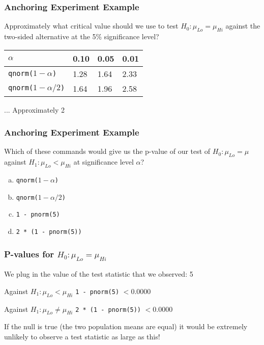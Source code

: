 \documentclass{beamer}
\begin{document}
\begin{frame}[t]
\frametitle{Anchoring Experiment Example }
Approximately what critical value should we use to test $H_0\colon \mu_{Lo} = \mu_{Hi}$ against the two-sided alternative at the 5\% significance level?

\pause
\vspace{1em}
\begin{center}
\begin{tabular}{l|lll}
$\alpha$ &   0.10& 0.05 &0.01\\
\hline
\texttt{qnorm($1-\alpha$)} & 1.28 &1.64 &2.33\\
\texttt{qnorm($1-\alpha/2$)} &1.64 &\alert{1.96}& 2.58
\end{tabular}
\end{center}
\hfill \alert{... Approximately 2}
\end{frame}
\begin{frame}
\frametitle{Anchoring Experiment Example}
Which of these commands would give us the p-value of our test of $H_0\colon \mu_{Lo} = \mu$ against $H_1\colon \mu_{Lo}<\mu_{Hi}$ at significance level $\alpha$?
\vspace{1em}
	\begin{enumerate}[(a)]
		\item \texttt{qnorm($1-\alpha$)}
		\item \texttt{qnorm($1-\alpha/2$)}
		\item \texttt{1 - pnorm(5)}
		\item \texttt{2 * (1 - pnorm(5))}
	\end{enumerate}
	

\end{frame}

\begin{frame}
\frametitle{P-values for $H_0\colon \mu_{Lo} = \mu_{Hi}$}
We plug in the value of the test statistic that we observed: 5
\begin{block}{Against $H_1\colon \mu_{Lo}< \mu_{Hi}$}
\texttt{1 - pnorm(5)} $< 0.0000$
\end{block}

\begin{block}{Against $H_1\colon \mu_{Lo}\neq \mu_{Hi}$}
\texttt{2 * (1 - pnorm(5))} $< 0.0000$
\end{block}

\vspace{1em}

\alert{If the null is true (the two population means are equal) it would be extremely unlikely to observe a test statistic as large as this!}

\vspace{1em} 
\hfill {}
\end{frame}
\end{document}
